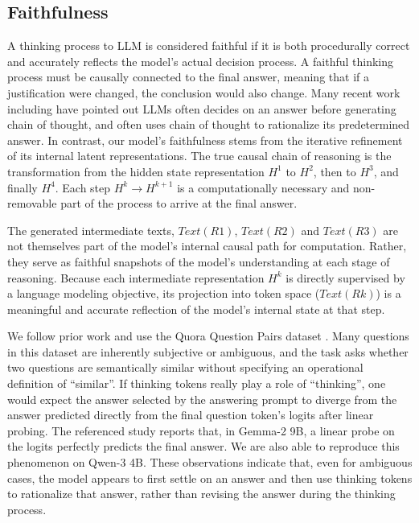 \documentclass[]{bytedance_seed}
\newcommand{\1}{\mathbf{1}}
\begin{document}
\subsection{Faithfulness}
A thinking process to LLM is considered faithful if it is both procedurally correct and accurately reflects the model's actual decision process. A faithful thinking process must be causally connected to the final answer, meaning that if a justification were changed, the conclusion would also change. Many recent work including \citep{Cox2024PostHocCoT, arcuschin2025chain0of0thought, barez-chain-2025, korbak2025chain} have pointed out LLMs often decides on an answer before generating chain of thought, and often uses chain of thought to rationalize its predetermined answer. In contrast, our model's faithfulness stems from the iterative refinement of its internal latent representations. The true causal chain of reasoning is the transformation from the hidden state representation $H^1$ to $H^2$, then to $H^3$, and finally $H^4$. Each step $H^k \rightarrow H^{k+1}$ is a computationally necessary and non-removable part of the process to arrive at the final answer.

The generated intermediate texts, $Text(R1)$, $Text(R2)$ and $Text(R3)$ are not themselves part of the model's internal causal path for computation. Rather, they serve as faithful snapshots of the model's understanding at each stage of reasoning. Because each intermediate representation $H^k$ is directly supervised by a language modeling objective, its projection into token space ($Text(Rk)$) is a meaningful and accurate reflection of the model's internal state at that step.

We follow prior work \citep{Cox2024PostHocCoT} and use the Quora Question Pairs dataset \citep{quora_question_pairs_kaggle}. Many questions in this dataset are inherently subjective or ambiguous, and the task asks whether two questions are semantically similar without specifying an operational definition of ``similar''. If thinking tokens really play a role of ``thinking'', one would expect the answer selected by the answering prompt to diverge from the answer predicted directly from the final question token’s logits after linear probing. The referenced study reports that, in Gemma-2 9B, a linear probe on the logits perfectly predicts the final answer. We are also able to reproduce this phenomenon on Qwen-3 4B. These observations indicate that, even for ambiguous cases, the model appears to first settle on an answer and then use thinking tokens to rationalize that answer, rather than revising the answer during the thinking process.
\end{document}
